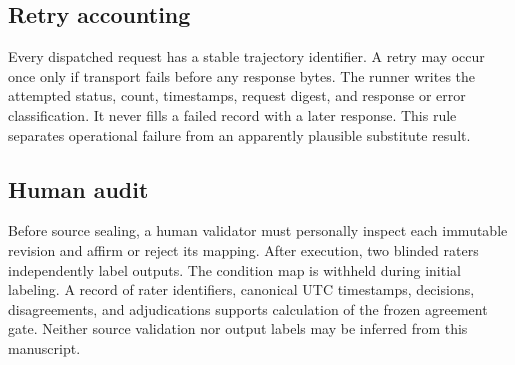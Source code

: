 \documentclass[11pt]{article}
\begin{document}
\subsection{Retry accounting}
Every dispatched request has a stable trajectory identifier. A retry may occur once only if transport fails before any response bytes. The runner writes the attempted status, count, timestamps, request digest, and response or error classification. It never fills a failed record with a later response. This rule separates operational failure from an apparently plausible substitute result.

\subsection{Human audit}
Before source sealing, a human validator must personally inspect each immutable revision and affirm or reject its mapping. After execution, two blinded raters independently label outputs. The condition map is withheld during initial labeling. A record of rater identifiers, canonical UTC timestamps, decisions, disagreements, and adjudications supports calculation of the frozen agreement gate. Neither source validation nor output labels may be inferred from this manuscript.



\end{document}
